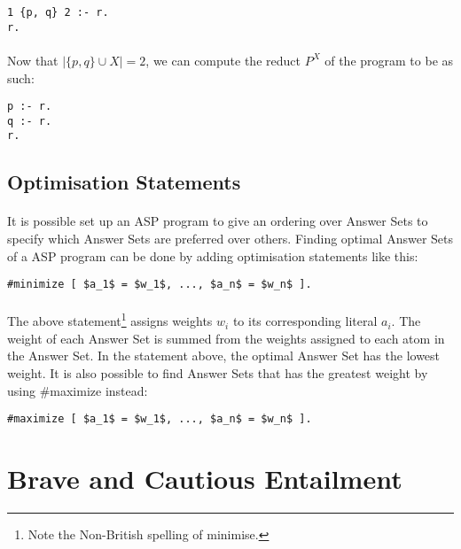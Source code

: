 \documentclass{article}
\theoremstyle{plain}
\theoremstyle{definition}
\begin{document}
\begin{multicols}{2}
\begin{lstlisting}
1 {p, q} 2 :- r.
r.
\end{lstlisting}

\paragraph{} Now that $| \{ p, q \} \cup X | = 2$, we can compute the reduct $P^X$ of the program to be as such:

\begin{lstlisting}
p :- r.
q :- r.
r.
\end{lstlisting}

\subsection{Optimisation Statements}

\paragraph{} It is possible set up an ASP program to give an ordering over Answer Sets to specify which Answer Sets are preferred over others. Finding optimal Answer Sets of a ASP program can be done by adding optimisation statements like this:

\begin{lstlisting}[mathescape=true]
#minimize [ $a_1$ = $w_1$, ..., $a_n$ = $w_n$ ].
\end{lstlisting}

\paragraph{} The above statement\footnote{Note the Non-British spelling of minimise.} assigns weights $w_i$ to its corresponding literal $a_i$. The weight of each Answer Set is summed from the weights assigned to each atom in the Answer Set. In the statement above, the optimal Answer Set has the lowest weight. It is also possible to find Answer Sets that has the greatest weight by using \#maximize instead:

\begin{lstlisting}[mathescape=true]
#maximize [ $a_1$ = $w_1$, ..., $a_n$ = $w_n$ ].
\end{lstlisting}

\section{Brave and Cautious Entailment}


\end{multicols}
\end{document}
